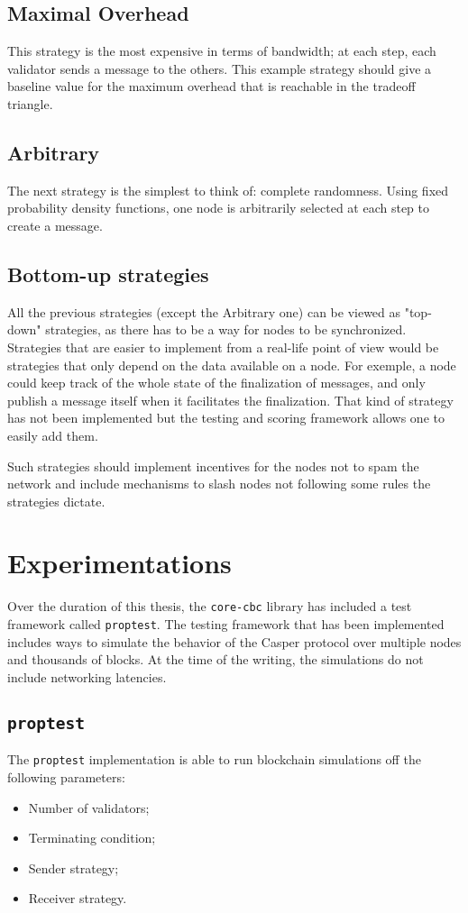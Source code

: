 \subsection{Maximal Overhead}
This strategy is the most expensive in terms of bandwidth; at each step, each
validator sends a message to the others. This example strategy should give a
baseline value for the maximum overhead that is reachable in the tradeoff
triangle.

\subsection{Arbitrary}
The next strategy is the simplest to think of: complete randomness. Using fixed
probability density functions, one node is arbitrarily selected at each step to
create a message. 

\subsection{Bottom-up strategies}
All the previous strategies (except the Arbitrary one) can be viewed as
"top-down" strategies, as there has to be a way for nodes to be synchronized.
Strategies that are easier to implement from a real-life point of view would be
strategies that only depend on the data available on a node. For exemple, a node
could keep track of the whole state of the finalization of messages, and only
publish a message itself when it facilitates the finalization. That kind of
strategy has not been implemented but the testing and scoring framework allows
one to easily add them.

Such strategies should implement incentives for the nodes not to spam the
network and include mechanisms to slash nodes not following some rules the
strategies dictate.

\section{Experimentations}
Over the duration of this thesis, the \texttt{core-cbc} library has included a
test framework called \texttt{proptest}. The testing framework that has been
implemented includes ways to simulate the behavior of the Casper protocol over
multiple nodes and thousands  of blocks. At the time of the
writing, the simulations do not include networking latencies.

\subsection{\texttt{proptest}}
The \texttt{proptest} implementation is able to run blockchain simulations off
the following parameters:
\begin{itemize}
    \item Number of validators;
    \item Terminating condition;
    \item Sender strategy;
    \item Receiver strategy.
\end{itemize}

